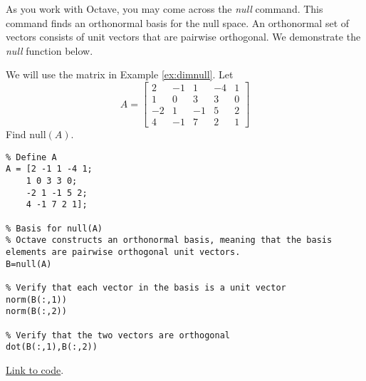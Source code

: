 \documentclass{ximera}
\begin{document}
As you work with Octave, you may come across the \emph{null} command.  This command finds an orthonormal basis for the null space.  An orthonormal set of vectors consists of unit vectors that are pairwise orthogonal.  We demonstrate the \emph{null} function below.

\begin{template}
    We will use the matrix in Example \ref{ex:dimnull}.  Let 
$$A=\begin{bmatrix}2&-1&1&-4&1\\1&0&3&3&0\\-2&1&-1&5&2\\4&-1&7&2&1\end{bmatrix}$$
Find $\mbox{null}(A)$.

\begin{verbatim}
% Define A
A = [2 -1 1 -4 1;
    1 0 3 3 0;
    -2 1 -1 5 2;
    4 -1 7 2 1];

% Basis for null(A)
% Octave constructs an orthonormal basis, meaning that the basis elements are pairwise orthogonal unit vectors.
B=null(A)

% Verify that each vector in the basis is a unit vector
norm(B(:,1))
norm(B(:,2))

% Verify that the two vectors are orthogonal
dot(B(:,1),B(:,2))
\end{verbatim}

\href{https://sagecell.sagemath.org/?z=eJxtjkFLxDAUhO-B_Ie5LLTQyqauLCh7aPHuzYt4iPV1G2hfJEl38d-b2Kg9mITAm2S-mR0eaTBMaKVoccJLg1pBoT5APUiBuBT2uI17n-e6Se8Kd2iyckjjEVF_jYoUO3TaG4_BOvAyTUVbJvGpD_pC6C374JY-eGiGdWG0bN2sJ7wlV4WZNBs-I4w6xItWHTTRTJxcjvChjbsaT6v_bDnaFzYBF-qDdf5Giu70m53Sn8mZ4XOFku7H_BOGNxnx6C1HilSt6Ir7SpXlZmrKf7CJE672p8N30b9-UrzbkFFVZnwBTjpvrw==&lang=octave&interacts=eJyLjgUAARUAuQ==}{Link to code}.
\end{template}
\end{document}
